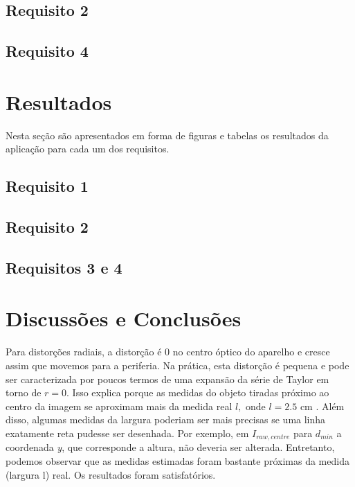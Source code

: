 \documentclass{bmvc2k}
\begin{document}
\subsection{Requisito 2}
\label{Methods:req2}






\subsection{Requisito 4}
\label{Met:Req4}



\section{Resultados}
\label{sec:Results}
Nesta seção são apresentados em forma de figuras e tabelas os resultados da aplicação para cada um dos requisitos. 
\subsection{Requisito 1}


\subsection{Requisito 2}


\subsection{Requisitos 3 e 4}
\label{res:Req4}


\section{Discussões e Conclusões}
\label{sec:Conclusion}
Para distorções radiais, a distorção é 0 no centro óptico do aparelho e cresce assim que movemos para a periferia. Na prática, esta distorção é pequena e pode ser caracterizada por poucos termos de uma expansão da série de Taylor em torno de $r = 0$. Isso explica porque as medidas do objeto tiradas próximo ao centro da imagem se aproximam mais da medida real $l, \mbox{ onde } l = 2.5 \mbox{ cm }$. Além disso, algumas medidas da largura poderiam ser mais precisas se uma linha exatamente reta pudesse ser desenhada. Por exemplo, em $I_{raw,centre}$ para $d_{min}$ a coordenada \textit{y}, que corresponde a altura, não deveria ser alterada. Entretanto, podemos observar que as medidas estimadas foram bastante próximas da medida (largura l) real. Os resultados foram satisfatórios. 


\end{document}
